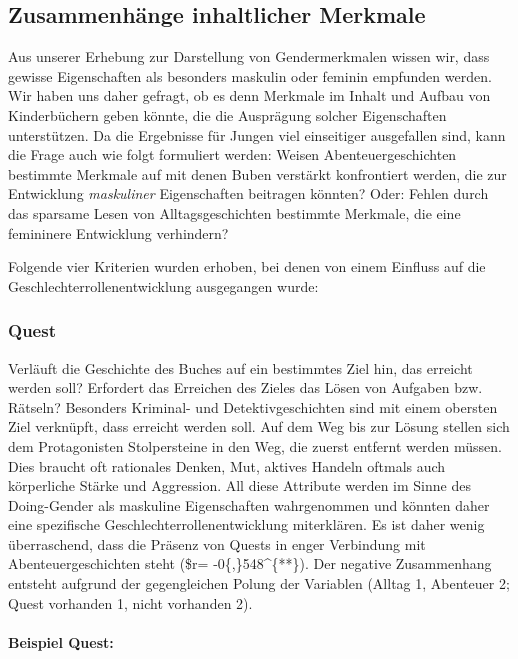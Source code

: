 \subsection{Zusammenhänge inhaltlicher Merkmale}

Aus unserer Erhebung zur Darstellung von Gendermerkmalen wissen wir,
dass gewisse Eigenschaften als besonders maskulin oder feminin empfunden
werden. Wir haben uns daher gefragt, ob es denn Merkmale im Inhalt und
Aufbau von Kinderbüchern geben könnte, die die Ausprägung solcher
Eigenschaften unterstützen. Da die Ergebnisse für Jungen viel
einseitiger ausgefallen sind, kann die Frage auch wie folgt formuliert
werden: Weisen Abenteuergeschichten bestimmte Merkmale auf mit denen
Buben verstärkt konfrontiert werden, die zur Entwicklung
\emph{maskuliner} Eigenschaften beitragen könnten? Oder: Fehlen durch
das sparsame Lesen von Alltagsgeschichten bestimmte Merkmale, die eine
femininere Entwicklung verhindern?

Folgende vier Kriterien wurden erhoben, bei denen von einem Einfluss auf
die Geschlechterrollenentwicklung ausgegangen wurde:

\subsubsection{Quest}

Verläuft die Geschichte des Buches auf ein bestimmtes Ziel hin, das
erreicht werden soll? Erfordert das Erreichen des Zieles das Lösen von
Aufgaben bzw. Rätseln? Besonders Kriminal- und Detektivgeschichten sind
mit einem obersten Ziel verknüpft, dass erreicht werden soll. Auf dem
Weg bis zur Lösung stellen sich dem Protagonisten Stolpersteine in den
Weg, die zuerst entfernt werden müssen. Dies braucht oft rationales
Denken, Mut, aktives Handeln oftmals auch körperliche Stärke und
Aggression. All diese Attribute werden im Sinne des Doing-Gender als
maskuline Eigenschaften wahrgenommen und könnten daher eine spezifische
Geschlechterrollenentwicklung miterklären. Es ist daher wenig
überraschend, dass die Präsenz von Quests in enger Verbindung mit
Abenteuergeschichten steht (\$r= -0\{,\}548\^{}\{**\}). Der negative
Zusammenhang entsteht aufgrund der gegengleichen Polung der Variablen
(Alltag 1, Abenteuer 2; Quest vorhanden 1, nicht vorhanden 2).

\paragraph{Beispiel Quest:}

